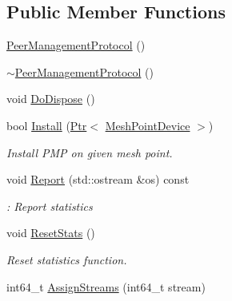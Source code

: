 \subsection*{Public Member Functions}
\begin{DoxyCompactItemize}
\item 
\hyperlink{classns3_1_1dot11s_1_1PeerManagementProtocol_a0e568f7724fb71e5dc4aa88eca7f19e1}{Peer\+Management\+Protocol} ()
\item 
\hyperlink{classns3_1_1dot11s_1_1PeerManagementProtocol_af2b9b0048b7523f40a655d61c70dfb77}{$\sim$\+Peer\+Management\+Protocol} ()
\item 
void \hyperlink{classns3_1_1dot11s_1_1PeerManagementProtocol_a89bc555099bee27f8218c6bc85aee2cf}{Do\+Dispose} ()
\item 
bool \hyperlink{classns3_1_1dot11s_1_1PeerManagementProtocol_af2c766d0bee3af07418f1c631e8c1b29}{Install} (\hyperlink{classns3_1_1Ptr}{Ptr}$<$ \hyperlink{classns3_1_1MeshPointDevice}{Mesh\+Point\+Device} $>$)
\begin{DoxyCompactList}\small\item\em Install P\+MP on given mesh point. \end{DoxyCompactList}\item 
void \hyperlink{classns3_1_1dot11s_1_1PeerManagementProtocol_a8b70dcd73b4823cea25ed325e3d92704}{Report} (std\+::ostream \&os) const 
\begin{DoxyCompactList}\small\item\em \+: Report statistics \end{DoxyCompactList}\item 
void \hyperlink{classns3_1_1dot11s_1_1PeerManagementProtocol_ae0ae15ba62d76e5effb25e15b135a689}{Reset\+Stats} ()
\begin{DoxyCompactList}\small\item\em Reset statistics function. \end{DoxyCompactList}\item 
int64\+\_\+t \hyperlink{classns3_1_1dot11s_1_1PeerManagementProtocol_a906718c4d7bca1b6e0936ba10356ce02}{Assign\+Streams} (int64\+\_\+t stream)
\end{DoxyCompactItemize}
